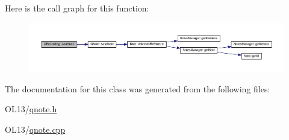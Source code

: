 Here is the call graph for this function\+:\nopagebreak
\begin{figure}[H]
\begin{center}
\leavevmode
\includegraphics[width=350pt]{class_q_recording_a37492f3dbda2dad2a8cd62012fe91b78_cgraph}
\end{center}
\end{figure}


The documentation for this class was generated from the following files\+:\begin{DoxyCompactItemize}
\item 
O\+L13/\hyperlink{qnote_8h}{qnote.\+h}\item 
O\+L13/\hyperlink{qnote_8cpp}{qnote.\+cpp}\end{DoxyCompactItemize}
